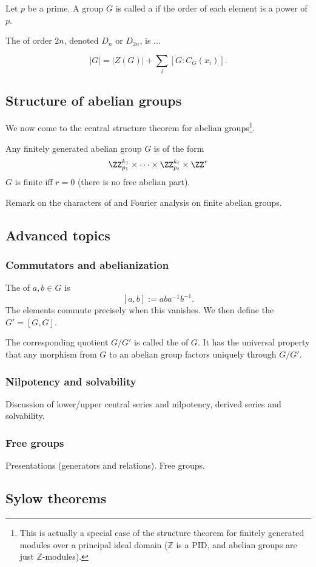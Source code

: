 \begin{definition}
Let $p$ be a prime. A group $G$ is called a  if the order of each element is a power of $p$.
\end{definition}

\begin{example}
The  of order $2n$, denoted $D_n$ or $D_{2n}$, is ...
\end{example}

\begin{theorem}
\[ |G| = |Z(G)| + \sum_i [G:C_G(x_i)]. \]
\end{theorem}

\subsection{Structure of abelian groups}

We now come to the central structure theorem for abelian groups\footnote{This is actually a special case of the structure theorem for finitely generated modules over a principal ideal domain ($\mathbb{Z}$ is a PID, and abelian groups are just $\mathbb{Z}$-modules).}.

\begin{theorem}
Any finitely generated abelian group $G$ is of the form
\[ \ZZ_{p_1}^{k_1} \times \cdots \times \ZZ_{p_\ell}^{k_\ell} \times \ZZ^r \]
$G$ is finite iff $r=0$ (there is no free abelian part).
\end{theorem}

\begin{remark}
Remark on the characters of and Fourier analysis on finite abelian groups.
\end{remark}

\subsection{Advanced topics}

\subsubsection{Commutators and abelianization}

The  of $a,b \in G$ is
\[ [a,b] := aba^{-1}b^{-1}. \]
The elements commute precisely when this vanishes. We then define the  $G' = [G,G]$. 

The corresponding quotient $G/G'$ is called the  of $G$. It has the universal property that any morphism from $G$ to an abelian group factors uniquely through $G/G'$.

\subsubsection{Nilpotency and solvability}

Discussion of lower/upper central series and nilpotency, derived series and solvability.

\subsubsection{Free groups}

Presentations (generators and relations). Free groups.

\subsection{Sylow theorems}